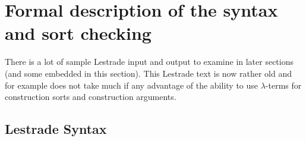\documentclass[12pt]{article}
\begin{document}
\newpage

\section{Formal description of the syntax and sort checking}

There is a lot of sample Lestrade input and output to examine in later sections (and some embedded in this section).  This Lestrade text is now rather old and for example does not take much if any advantage of the ability to use $\lambda$-terms for construction sorts and construction arguments.

\subsection{Lestrade Syntax}
\end{document}
